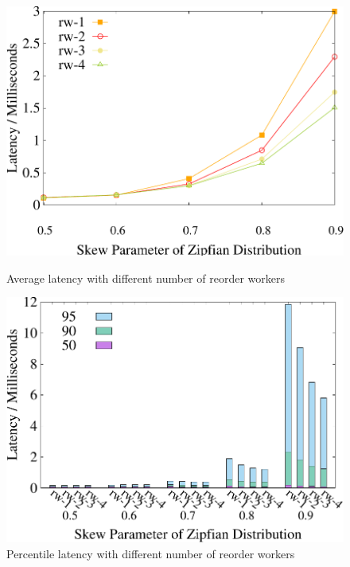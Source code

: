 \begin{figure}[t]
	\begin{minipage}[b]{0.32\linewidth}
	\centering
	\includegraphics[width=\textwidth]{./exp_fig/reorder/latency}
	\vspace{-2em}
	\caption{Average latency with different number of reorder workers}
	\label{fig:reorder:latency}
	\end{minipage}    
	\begin{minipage}[b]{0.32\linewidth}
	\centering
	\includegraphics[width=\textwidth]{./exp_fig/reorder/percent95_latency}
	\vspace{-2em}
	\caption{Percentile latency with different number of reorder workers}
	\label{fig:reorder:p95}
	\end{minipage}    

\end{figure}
